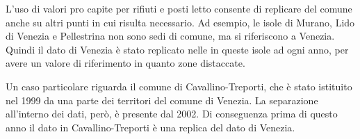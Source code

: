 \documentclass[a4paper,11pt,twoside,openright]{book}							%
\begin{document}
L'uso di valori pro capite per rifiuti e posti letto consente di replicare del comune anche su altri punti in cui risulta necessario. Ad esempio, le isole di Murano, Lido di Venezia e Pellestrina non sono sedi di comune, ma si riferiscono a Venezia. Quindi il dato di Venezia è stato replicato nelle in queste isole ad ogni anno, per avere un valore di riferimento in quanto zone distaccate.

Un caso particolare riguarda il comune di Cavallino-Treporti, che è stato istituito nel 1999 da una parte dei territori del comune di Venezia. La separazione all'interno dei dati, però, è presente dal 2002. Di conseguenza prima di questo anno il dato in Cavallino-Treporti è una replica del dato di Venezia.
\end{document}
